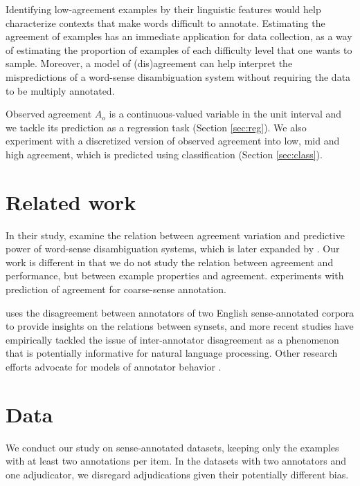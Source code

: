 \documentclass[11pt,a4paper]{article}
\begin{document}



Identifying low-agreement examples by their linguistic features would help characterize contexts that make words difficult to annotate. Estimating the agreement of examples has an immediate application for data collection, as a way of estimating the proportion of examples of each difficulty level that one wants to sample. Moreover, a model of (dis)agreement can help interpret the mispredictions of a word-sense disambiguation system without requiring the data to be multiply annotated. 

Observed agreement $A_o$ is a continuous-valued variable in the unit interval and we tackle its prediction as a regression task (Section \ref{sec:reg}). We also experiment with a discretized version of observed agreement into low, mid and high agreement, which is predicted using classification (Section \ref{sec:class}).  

\section{Related work}

In their study,  examine the relation between agreement variation and predictive power of word-sense disambiguation systems, which is later expanded by . Our work is different in that we do not study the relation between agreement and performance, but between example properties and agreement.  experiments with prediction of agreement for coarse-sense annotation. 

 uses the disagreement between annotators of two English sense-annotated corpora to provide insights on the relations between synsets, and more recent studies \cite{Jurgens2013,Plank2014,Jurgens2014,lopezdelacalleagirre2015} have empirically tackled the issue of inter-annotator disagreement as a phenomenon that is potentially informative for natural language processing. Other research efforts advocate for models of annotator behavior \cite{passonneau2009making,Passenau2010,Passonneau2014,Cohn2013}. 

\section{Data}
We conduct our study on sense-annotated datasets, keeping only the examples with at least two annotations per item. 
In the datasets with two annotators and one adjudicator, we disregard adjudications given their potentially different bias.
\end{document}
